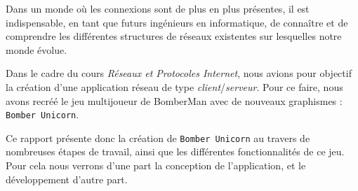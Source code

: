 Dans un monde où les connexions sont de plus en plus présentes, il est indispensable, en tant que futurs ingénieurs en informatique, de connaître et de comprendre les différentes structures de réseaux existentes sur lesquelles notre monde évolue.

\vspace{0.5cm}

Dans le cadre du cours \textit{Réseaux et Protocoles Internet}, nous avions pour objectif la création d'une application réseau de type \textit{client}/\textit{serveur}. Pour ce faire, nous avons recréé le jeu multijoueur de BomberMan avec de nouveaux graphismes : \texttt{Bomber Unicorn}.

\vspace{0.5cm}

Ce rapport présente donc la création de \texttt{Bomber Unicorn} au travers de nombreuses étapes de travail, ainsi que les différentes fonctionnalités de ce jeu. Pour cela nous verrons d'une part la conception de l'application, et le développement d'autre part. 
